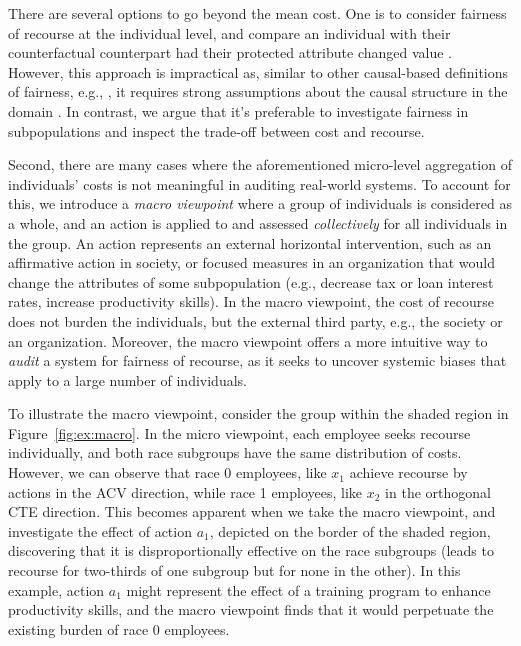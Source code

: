 \documentclass{article}
\begin{document}
There are several options to go beyond the mean cost. One is to consider fairness of recourse at the individual level, and compare an individual with their counterfactual counterpart had their protected attribute changed value \cite{KugelgenKBVWS22}. However, this approach is impractical as, similar to other causal-based definitions of fairness, e.g., \cite{kusner2017counterfactual}, it requires strong assumptions about the causal structure in the domain \cite{KarimiSV21}. In contrast, we argue that it's preferable to investigate fairness in subpopulations and inspect the trade-off between cost and recourse.

Second, there are many cases where the aforementioned micro-level aggregation of individuals' costs is not meaningful in auditing real-world systems. To account for this, we introduce a \emph{macro viewpoint} where a group of individuals is considered as a whole, and an action is applied to and assessed \emph{collectively} for all individuals in the group. An action represents an external horizontal intervention, such as an affirmative action in society, or focused measures in an organization that would change the attributes of some subpopulation (e.g., decrease tax or loan interest rates, increase productivity skills). In the macro viewpoint, the cost of recourse does not burden the individuals, but the external third party, e.g., the society or an organization. Moreover, the macro viewpoint offers a more intuitive way to \emph{audit} a system for fairness of recourse, as it seeks to uncover systemic biases that apply to a large number of individuals.


To illustrate the macro viewpoint, consider the group within the shaded region in Figure~\ref{fig:ex:macro}. In the micro viewpoint, each employee seeks recourse individually, and both race subgroups have the same distribution of costs. However, we can observe that race 0 employees, like $x_1$ achieve recourse by actions in the ACV direction, while race 1 employees, like $x_2$ in the orthogonal CTE direction. This becomes apparent when we take the macro viewpoint, and investigate the effect of action $a_1$, depicted on the border of the shaded region, discovering that it is disproportionally effective on the race subgroups (leads to recourse for two-thirds of one subgroup but for none in the other). In this example, action $a_1$ might represent the effect of a training program to enhance productivity skills, and the macro viewpoint finds that it would perpetuate the existing burden of race 0 employees.
\end{document}
